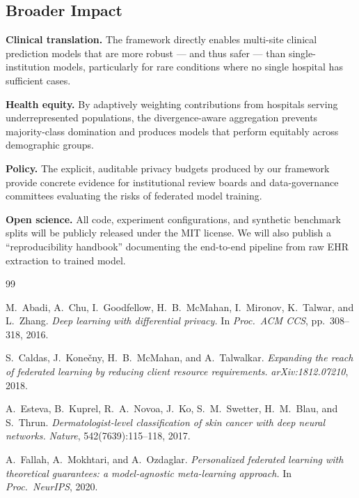\documentclass[11pt,a4paper]{article}
\begin{document}
{\subsection{Broader Impact}

\textbf{Clinical translation.} The framework directly enables multi-site clinical prediction
models that are more robust — and thus safer — than single-institution models, particularly
for rare conditions where no single hospital has sufficient cases.

\textbf{Health equity.} By adaptively weighting contributions from hospitals serving
underrepresented populations, the divergence-aware aggregation prevents majority-class
domination and produces models that perform equitably across demographic groups.

\textbf{Policy.} The explicit, auditable privacy budgets produced by our framework provide
concrete evidence for institutional review boards and data-governance committees evaluating
the risks of federated model training.

\textbf{Open science.} All code, experiment configurations, and synthetic benchmark splits
will be publicly released under the MIT license. We will also publish a ``reproducibility
handbook'' documenting the end-to-end pipeline from raw EHR extraction to trained model.


\begin{thebibliography}{99}

M.\ Abadi, A.\ Chu, I.\ Goodfellow, H.\ B.\ McMahan, I.\ Mironov, K.\ Talwar, and L.\ Zhang.
\emph{Deep learning with differential privacy.}
In \textit{Proc.\ ACM CCS}, pp.\ 308--318, 2016.

S.\ Caldas, J.\ Kone\v{c}ny, H.\ B.\ McMahan, and A.\ Talwalkar.
\emph{Expanding the reach of federated learning by reducing client resource requirements.}
\textit{arXiv:1812.07210}, 2018.

A.\ Esteva, B.\ Kuprel, R.\ A.\ Novoa, J.\ Ko, S.\ M.\ Swetter, H.\ M.\ Blau, and S.\ Thrun.
\emph{Dermatologist-level classification of skin cancer with deep neural networks.}
\textit{Nature}, 542(7639):115--118, 2017.

A.\ Fallah, A.\ Mokhtari, and A.\ Ozdaglar.
\emph{Personalized federated learning with theoretical guarantees: a model-agnostic
  meta-learning approach.}
In \textit{Proc.\ NeurIPS}, 2020.


\end{thebibliography}}
\end{document}
